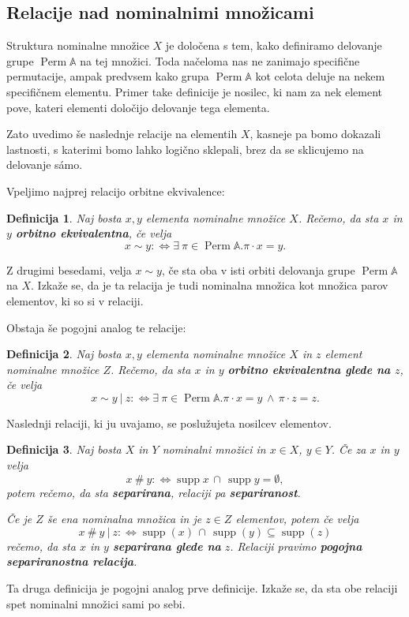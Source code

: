 \documentclass{article}
\DeclareMathOperator{\Perm}{Perm}
\DeclareMathOperator{\supp}{supp}
\newtheorem{definicija}{Definicija}
\begin{document}
\subsection{Relacije nad nominalnimi množicami}

Struktura nominalne množice \(X\) je določena s tem, kako definiramo delovanje grupe \(\Perm\mathds{A}\) na tej množici. Toda načeloma nas ne zanimajo specifične permutacije, ampak predvsem kako grupa \(\Perm\mathds{A}\) kot celota deluje na nekem specifičnem elementu. Primer take definicije je nosilec, ki nam za nek element pove, kateri elementi določijo delovanje tega elementa.

Zato uvedimo še naslednje relacije na elementih \(X\), kasneje pa bomo dokazali lastnosti, s katerimi bomo lahko logično sklepali, brez da se sklicujemo na delovanje sámo.

Vpeljimo najprej relacijo orbitne ekvivalence:
\begin{definicija}
    Naj bosta \(x, y\) elementa nominalne množice \(X\). Rečemo, da sta \(x\) in \(y\) \textbf{orbitno ekvivalentna}, če velja
    \[
        x \sim y :\Longleftrightarrow \exists\ \pi \in \Perm \mathds{A}. \pi \cdot x = y.
    \]
\end{definicija}
Z drugimi besedami, velja \(x \sim y\), če sta oba v isti orbiti delovanja grupe \(\Perm \mathds{A}\) na \(X\). Izkaže se, da je ta relacija je tudi nominalna množica kot množica parov elementov, ki so si v relaciji.

Obstaja še pogojni analog te relacije:
\begin{definicija}
    Naj bosta \(x, y\) elementa nominalne množice \(X\) in \(z\) element nominalne množice \(Z\). Rečemo, da sta \(x\) in \(y\) \textbf{orbitno ekvivalentna glede na \(z\)}, če velja
    \[
        x \sim y \ \vert \ z :\Longleftrightarrow \exists\ \pi \in \Perm \mathds{A}. \pi \cdot x = y\, \wedge\, \pi \cdot z = z.
    \]
\end{definicija}

Naslednji relaciji, ki ju uvajamo, se poslužujeta nosilcev elementov.
\begin{definicija}
    Naj bosta \(X\) in \(Y\) nominalni množici in \(x \in X\), \(y \in Y\). Če za \(x\) in \(y\) velja
    \[
        x \ \#\ y :\Longleftrightarrow \supp x\, \cap\, \supp y = \emptyset,
    \]
    potem rečemo, da sta \textbf{separirana}, relaciji pa \textbf{separiranost}.
    
    Če je \(Z\) še ena nominalna množica in je \(z \in Z\) elementov, potem če velja
    \[
        x \ \#\  y \ \vert \ z :\Longleftrightarrow \supp(x)\, \cap\, \supp(y) \subseteq \supp(z)
    \]
    rečemo, da sta \(x\) in \(y\) \textbf{separirana glede na} \(z\). Relaciji pravimo \textbf{pogojna separiranostna relacija}.  %
\end{definicija}
Ta druga definicija je pogojni analog prve definicije.
Izkaže se, da sta obe relaciji spet nominalni množici sami po sebi.
\end{document}
